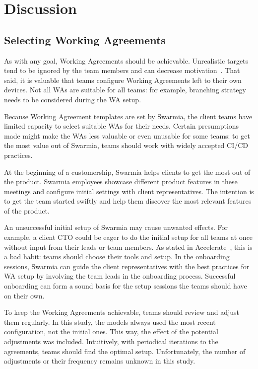 \chapter{Discussion}

\section{Selecting Working Agreements}

As with any goal, Working Agreements should be achievable. Unrealistic targets tend to be ignored by the team members and can decrease motivation~\cite{forsgren_space_2021}. That said, it is valuable that teams configure Working Agreements left to their own devices. Not all WAs are suitable for all teams: for example, branching strategy needs to be considered during the WA setup.  

Because Working Agreement templates are set by Swarmia, the client teams have limited capacity to select suitable WAs for their needs. Certain presumptions made might make the WAs less valuable or even unusable for some teams: to get the most value out of Swarmia, teams should work with widely accepted CI/CD practices. 

At the beginning of a customership, Swarmia helps clients to get the most out of the product. Swarmia employees showcase different product features in these meetings and configure initial settings with client representatives. The intention is to get the team started swiftly and help them discover the most relevant features of the product.

An unsuccessful initial setup of Swarmia may cause unwanted effects. For example, a client CTO could be eager to do the initial setup for all teams at once without input from their leads or team members. As stated in Accelerate~\cite{forsgren_accelerate_2018}, this is a bad habit: teams should choose their tools and setup. In the onboarding sessions, Swarmia can guide the client representatives with the best practices for WA setup by involving the team leads in the onboarding process. Successful onboarding can form a sound basis for the setup sessions the teams should have on their own. 

To keep the Working Agreements achievable, teams should review and adjust them regularly. In this study, the models always used the most recent configuration, not the initial ones. This way, the effect of the potential adjustments was included. Intuitively, with periodical iterations to the agreements, teams should find the optimal setup. Unfortunately, the number of adjustments or their frequency remains unknown in this study. 

